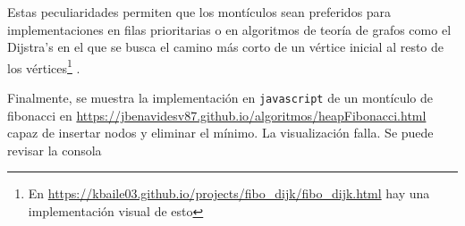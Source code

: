 \documentclass[paper=leter, fontsize=11pt]{scrartcl}
\numberwithin{equation}{section}		%
\numberwithin{figure}{section}			%
\numberwithin{table}{section}				%
\begin{document}
Estas peculiaridades permiten que los montículos sean preferidos para implementaciones en filas prioritarias o en algoritmos de teoría de grafos como el Dijstra's en el que se busca el camino más corto de un vértice inicial al resto de los vértices\footnote{En \url{https://kbaile03.github.io/projects/fibo_dijk/fibo_dijk.html} hay una implementación visual de esto} \cite{binary_heap}.

Finalmente, se muestra la implementación en \texttt{javascript} de un montículo de fibonacci en \url{https://jbenavidesv87.github.io/algoritmos/heapFibonacci.html} capaz de insertar nodos y eliminar el mínimo. La visualización falla. Se puede revisar la consola



\end{document}
